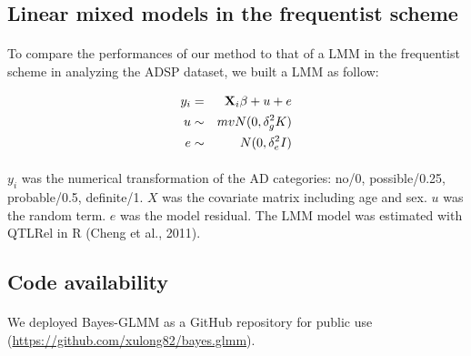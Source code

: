 \documentclass[12pt]{article}
\begin{document}
\subsection*{Linear mixed models in the frequentist scheme}

\paragraph{}{
To compare the performances of our method to that of a LMM in the frequentist scheme in analyzing the ADSP dataset, we built a LMM as follow: 
}

\begin{eqnarray}
   y_i & = &  \bold{X}_i \beta + u + e \\
   u & \sim & mvN(0, \delta^2_g K) \\
   e & \sim & N(0, \delta^2_e I)
\end{eqnarray}

\paragraph{}{
$y_i$ was the numerical transformation of the AD categories: no/0, possible/0.25, probable/0.5, definite/1. $X$ was the covariate matrix including age and sex. $u$ was the random term. $e$ was the model residual. The LMM model was estimated with QTLRel in R (Cheng et al., 2011).
}

\subsection*{Code availability}

\paragraph{}{
We deployed Bayes-GLMM as a GitHub repository for public use (\url{https://github.com/xulong82/bayes.glmm}).

}
\end{document}
